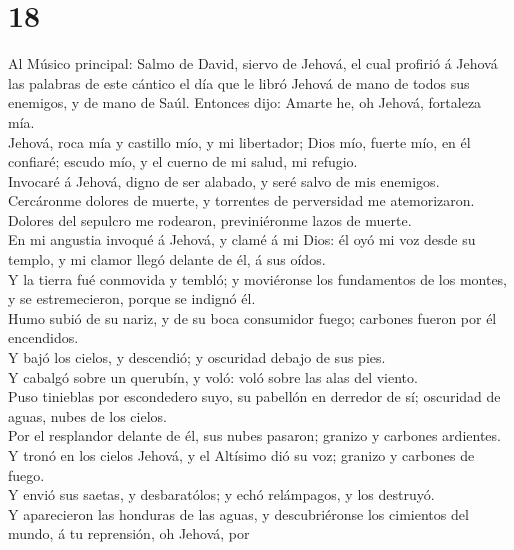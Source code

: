 \hypertarget{section-17}{%
\section{18}\label{section-17}}

 Al Músico principal: Salmo de David, siervo de Jehová, el
cual profirió á Jehová las palabras de este cántico el día que le libró
Jehová de mano de todos sus enemigos, y de mano de Saúl. Entonces dijo:
Amarte he, oh Jehová, fortaleza mía.\\
 Jehová, roca mía y castillo mío, y mi libertador; Dios
mío, fuerte mío, en él confiaré; escudo mío, y el cuerno de mi salud, mi
refugio.\\
 Invocaré á Jehová, digno de ser alabado, y seré salvo de
mis enemigos.\\
 Cercáronme dolores de muerte, y torrentes de perversidad
me atemorizaron.\\
 Dolores del sepulcro me rodearon, previniéronme lazos de
muerte.\\
 En mi angustia invoqué á Jehová, y clamé á mi Dios: él
oyó mi voz desde su templo, y mi clamor llegó delante de él, á sus
oídos.\\
 Y la tierra fué conmovida y tembló; y moviéronse los
fundamentos de los montes, y se estremecieron, porque se indignó él.\\
 Humo subió de su nariz, y de su boca consumidor fuego;
carbones fueron por él encendidos.\\
 Y bajó los cielos, y descendió; y oscuridad debajo de sus
pies.\\
 Y cabalgó sobre un querubín, y voló: voló sobre las alas
del viento.\\
 Puso tinieblas por escondedero suyo, su pabellón en
derredor de sí; oscuridad de aguas, nubes de los cielos.\\
 Por el resplandor delante de él, sus nubes pasaron;
granizo y carbones ardientes.\\
 Y tronó en los cielos Jehová, y el Altísimo dió su voz;
granizo y carbones de fuego.\\
 Y envió sus saetas, y desbaratólos; y echó relámpagos, y
los destruyó.\\
 Y aparecieron las honduras de las aguas, y
descubriéronse los cimientos del mundo, á tu reprensión, oh Jehová, por
